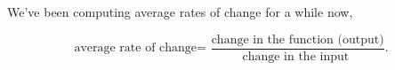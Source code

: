 \documentclass{ximera}
\begin{document}
We've been computing average rates of change for a while now, 

\[
{\text{average rate of change=
    }}
\frac{\text{change in the function (output)}}{\text{change in the input 
   }}.
\]
\begin{comment}
 how exactly does one find the function that will give the
instantaneous rate of change? Recall that the instantaneous rate of change
of a line is the slope of the line.  Hence the instantaneous rate of
change of a function is the slope of the tangent line. For now,
consider the following informal definition of a \textit{tangent line}:
\begin{quote}\index{tangent line}
Given a function $f$ and a number $a$ in the domain of $f$, if one can ``zoom in''
on the graph at $(a, f(a))$ sufficiently so that it appears to be a straight line,
then that line is the \dfn{tangent line} to $f(x)$ at the point $(a,f(a))$.
\end{quote}
We illustrate this informal definition with the following diagram:
\begin{image}
\begin{tikzpicture}
  \begin{axis}[
            domain=0:6, range=0:7,
            ymin=-.2,ymax=7,
            width=6in,
            height=2.5in, %
            axis lines=none,
          ]   
          \addplot [draw=none, fill=textColor!10!background] plot coordinates {(.8,1.6) (2.834,5)} \closedcycle; %
          \addplot [draw=none, fill=textColor!10!background] plot coordinates {(2.834,5) (4.166,5)} \closedcycle; %
          \addplot [draw=none, fill=background] plot coordinates {(1.2,1.6) (4.166,5)} \closedcycle; %
          \addplot [draw=none, fill=background] plot coordinates {(.8,1.6) (1.2,1.6)} \closedcycle; %

          \addplot [draw=none, fill=textColor!10!background] plot coordinates {(3.3,3.6) (5.334,5)} \closedcycle; %
          \addplot [draw=none, fill=textColor!10!background] plot coordinates {(5.334,5) (6.666,5)} \closedcycle; %
          \addplot [draw=none, fill=background] plot coordinates {(3.7,3.6) (6.666,5)} \closedcycle; %
          \addplot [draw=none, fill=background] plot coordinates {(3.3,3.6) (3.7,3.6)} \closedcycle; %
          
          \addplot [draw=none, fill=textColor!10!background] plot coordinates {(3.7,2.4) (6.666,1)} \closedcycle; %
          \addplot [draw=none, fill=textColor!10!background] plot coordinates {(3.3,2.4) (3.7,2.4)} \closedcycle; %
          \addplot [draw=none, fill=background] plot coordinates {(3.3,2.4) (5.334,1)} \closedcycle; %
          \addplot [draw=none, fill=background] plot coordinates {(5.334,1) (6.666,1)} \closedcycle; %
          


\end{comment}
\end{document}
